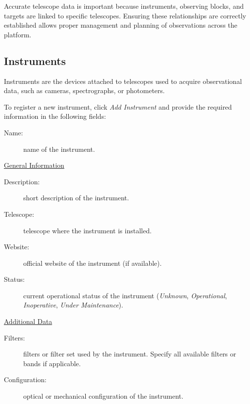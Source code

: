 
Accurate telescope data is important because instruments, observing blocks, and targets are linked to specific telescopes. Ensuring these relationships are correctly established allows proper management and planning of observations across the platform.

\subsection{Instruments}

Instruments are the devices attached to telescopes used to acquire observational data, such as cameras, spectrographs, or photometers. 

To register a new instrument, click \textsl{Add Instrument} and provide the required information in the following fields:

\begin{description}
	\item[Name:] name of the instrument.
\end{description}


\underline{General Information}

\begin{description}
	\item[Description:] short description of the instrument.
	\item[Telescope:] telescope where the instrument is installed.
	\item[Website:] official website of the instrument (if available).
	\item[Status:] current operational status of the instrument (\textsl{Unknown}, \textsl{Operational}, \textsl{Inoperative}, \textsl{Under Maintenance}).
\end{description}


\newpage

\underline{Additional Data}

\begin{description}
	\item[Filters:] filters or filter set used by the instrument. Specify all available filters or bands if applicable.
	\item[Configuration:] optical or mechanical configuration of the instrument. 
\end{description}


